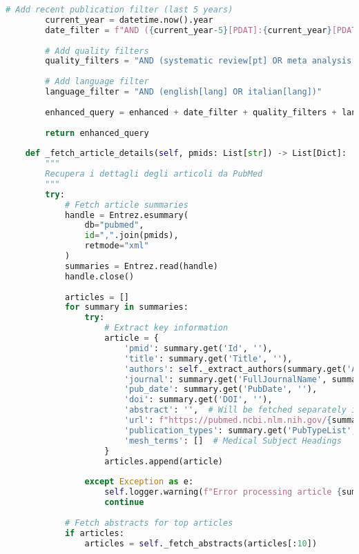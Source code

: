 \documentclass[12pt,a4paper]{report}
\begin{document}
\begin{lstlisting}[language=Python, caption=PubMed Service Implementation]
        # Add recent publication filter (last 5 years)
        current_year = datetime.now().year
        date_filter = f"AND ({current_year-5}[PDAT]:{current_year}[PDAT])"
        
        # Add quality filters
        quality_filters = "AND (systematic review[pt] OR meta analysis[pt] OR randomized controlled trial[pt] OR clinical trial[pt] OR review[pt])"
        
        # Add language filter
        language_filter = "AND (english[lang] OR italian[lang])"
        
        enhanced_query = enhanced + date_filter + quality_filters + language_filter
        
        return enhanced_query
    
    def _fetch_article_details(self, pmids: List[str]) -> List[Dict]:
        """
        Recupera i dettagli degli articoli da PubMed
        """
        try:
            # Fetch article summaries
            handle = Entrez.esummary(
                db="pubmed",
                id=",".join(pmids),
                retmode="xml"
            )
            summaries = Entrez.read(handle)
            handle.close()
            
            articles = []
            for summary in summaries:
                try:
                    # Extract key information
                    article = {
                        'pmid': summary.get('Id', ''),
                        'title': summary.get('Title', ''),
                        'authors': self._extract_authors(summary.get('Authors', [])),
                        'journal': summary.get('FullJournalName', summary.get('Source', '')),
                        'pub_date': summary.get('PubDate', ''),
                        'doi': summary.get('DOI', ''),
                        'abstract': '',  # Will be fetched separately if needed
                        'url': f"https://pubmed.ncbi.nlm.nih.gov/{summary.get('Id', '')}",
                        'publication_types': summary.get('PubTypeList', []),
                        'mesh_terms': []  # Medical Subject Headings
                    }
                    articles.append(article)
                    
                except Exception as e:
                    self.logger.warning(f"Error processing article {summary.get('Id', 'unknown')}: {e}")
                    continue
            
            # Fetch abstracts for top articles
            if articles:
                articles = self._fetch_abstracts(articles[:10])
            

\end{lstlisting}
\end{document}
